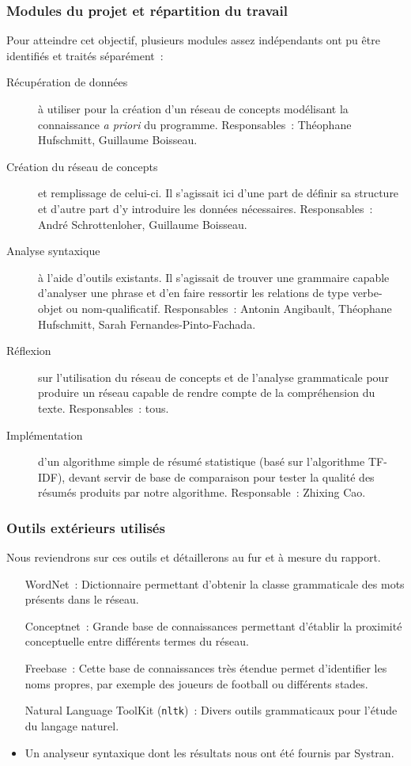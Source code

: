 \documentclass[a4paper, 12pt]{article}
\newcommand{\pyt}[1]{\texttt{#1}}%
\begin{document}
\subsubsection{Modules du projet et répartition du travail}

Pour atteindre cet objectif, plusieurs modules assez indépendants ont pu être identifiés et traités séparément~:

\begin{description}
	\item[Récupération de données] à utiliser pour la création d'un réseau de concepts modélisant la connaissance \textit{a priori} du programme. Responsables~: Théophane Hufschmitt, Guillaume Boisseau.
	\item[Création du réseau de concepts] et remplissage de celui-ci. Il s'agissait ici d'une part de définir sa structure et d'autre part d'y introduire les données nécessaires. Responsables~: André Schrottenloher, Guillaume Boisseau.
	\item[Analyse syntaxique] à l'aide d'outils existants. Il s'agissait de trouver une grammaire capable d'analyser une phrase et d'en faire ressortir les relations de type verbe-objet ou nom-qualificatif. Responsables~: Antonin Angibault, Théophane Hufschmitt, Sarah Fernandes-Pinto-Fachada.
	\item[Réflexion] sur l'utilisation du réseau de concepts et de l'analyse grammaticale pour produire un réseau capable de rendre compte de la compréhension du texte. Responsables~: tous.
	\item[Implémentation] d'un algorithme simple de résumé statistique (basé sur l'algorithme TF-IDF), devant servir de base de comparaison pour tester la qualité des résumés produits par notre algorithme.  Responsable~: Zhixing Cao.
\end{description}

\subsubsection{Outils extérieurs utilisés}

Nous reviendrons sur ces outils et détaillerons au fur et à mesure du rapport.

\begin{itemize}
	\item[WordNet~: ]Dictionnaire permettant d'obtenir la classe grammaticale des mots présents dans le réseau.
	\item[Conceptnet~: ]Grande base de connaissances permettant d'établir la proximité conceptuelle entre différents termes du réseau.
	\item[Freebase~: ]Cette base de connaissances très étendue permet d'identifier les noms propres, par exemple des joueurs de football ou différents stades.
	\item[Natural Language ToolKit (\pyt{nltk})~: ]Divers outils grammaticaux pour l'étude du langage naturel.
	\item Un analyseur syntaxique dont les résultats nous ont été fournis par Systran.
\end{itemize}
\end{document}
